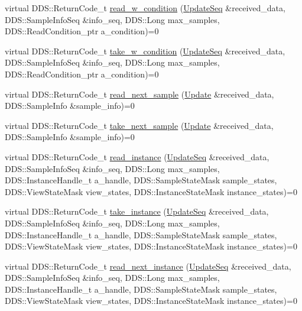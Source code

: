 \begin{DoxyCompactItemize}
virtual DDS::ReturnCode\_\-t \hyperlink{classKnowledge_1_1UpdateDataReaderView_a032d5e331d406106174f5a457f37803d}{read\_\-w\_\-condition} (\hyperlink{namespaceKnowledge_ab62e46316b954f0d249e0e45de7059dc}{UpdateSeq} \&received\_\-data, DDS::SampleInfoSeq \&info\_\-seq, DDS::Long max\_\-samples, DDS::ReadCondition\_\-ptr a\_\-condition)=0
\item 
virtual DDS::ReturnCode\_\-t \hyperlink{classKnowledge_1_1UpdateDataReaderView_a509e331b78354c9fcdd7667d4bd80461}{take\_\-w\_\-condition} (\hyperlink{namespaceKnowledge_ab62e46316b954f0d249e0e45de7059dc}{UpdateSeq} \&received\_\-data, DDS::SampleInfoSeq \&info\_\-seq, DDS::Long max\_\-samples, DDS::ReadCondition\_\-ptr a\_\-condition)=0
\item 
virtual DDS::ReturnCode\_\-t \hyperlink{classKnowledge_1_1UpdateDataReaderView_a7c64f7bea38ec05f4168df0b31457a94}{read\_\-next\_\-sample} (\hyperlink{structKnowledge_1_1Update}{Update} \&received\_\-data, DDS::SampleInfo \&sample\_\-info)=0
\item 
virtual DDS::ReturnCode\_\-t \hyperlink{classKnowledge_1_1UpdateDataReaderView_a7554fcf0ff6e115ad9c9a6fa614cd47c}{take\_\-next\_\-sample} (\hyperlink{structKnowledge_1_1Update}{Update} \&received\_\-data, DDS::SampleInfo \&sample\_\-info)=0
\item 
virtual DDS::ReturnCode\_\-t \hyperlink{classKnowledge_1_1UpdateDataReaderView_ad1ba6eff879b04ddf4b80342b7278bfb}{read\_\-instance} (\hyperlink{namespaceKnowledge_ab62e46316b954f0d249e0e45de7059dc}{UpdateSeq} \&received\_\-data, DDS::SampleInfoSeq \&info\_\-seq, DDS::Long max\_\-samples, DDS::InstanceHandle\_\-t a\_\-handle, DDS::SampleStateMask sample\_\-states, DDS::ViewStateMask view\_\-states, DDS::InstanceStateMask instance\_\-states)=0
\item 
virtual DDS::ReturnCode\_\-t \hyperlink{classKnowledge_1_1UpdateDataReaderView_a595e41d355590e3a3ad248c32da9fdcf}{take\_\-instance} (\hyperlink{namespaceKnowledge_ab62e46316b954f0d249e0e45de7059dc}{UpdateSeq} \&received\_\-data, DDS::SampleInfoSeq \&info\_\-seq, DDS::Long max\_\-samples, DDS::InstanceHandle\_\-t a\_\-handle, DDS::SampleStateMask sample\_\-states, DDS::ViewStateMask view\_\-states, DDS::InstanceStateMask instance\_\-states)=0
\item 
virtual DDS::ReturnCode\_\-t \hyperlink{classKnowledge_1_1UpdateDataReaderView_a892f7a9a097ea0e20b83a9644e43b088}{read\_\-next\_\-instance} (\hyperlink{namespaceKnowledge_ab62e46316b954f0d249e0e45de7059dc}{UpdateSeq} \&received\_\-data, DDS::SampleInfoSeq \&info\_\-seq, DDS::Long max\_\-samples, DDS::InstanceHandle\_\-t a\_\-handle, DDS::SampleStateMask sample\_\-states, DDS::ViewStateMask view\_\-states, DDS::InstanceStateMask instance\_\-states)=0

\end{DoxyCompactItemize}
